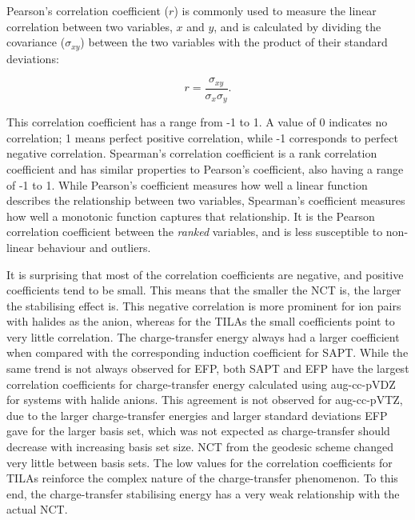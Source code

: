 Pearson's correlation coefficient ($r$) is commonly used to measure the linear correlation between two variables, $x$ and $y$, and is calculated by dividing the covariance ($\sigma_{xy}$) between the two variables with the product of their standard deviations:

\begin{equation}
    r = \frac{\sigma_{xy}}{\sigma_x \sigma_y}.
\end{equation}

This correlation coefficient has a range from -1 to 1.
A value of 0 indicates no correlation; 1 means perfect positive correlation, while -1 corresponds to perfect negative correlation.
Spearman's correlation coefficient is a rank correlation coefficient and has similar properties to Pearson's coefficient, also having a range of -1 to 1. 
While Pearson's coefficient measures how well a linear function describes the relationship between two variables, Spearman's coefficient measures how well a monotonic function captures that relationship.
It is the Pearson correlation coefficient between the \emph{ranked} variables, and is less susceptible to non-linear behaviour and outliers.


It is surprising that most of the correlation coefficients are negative, and positive coefficients tend to be small.
This means that the smaller the NCT is, the larger the stabilising effect is.
This negative correlation is more prominent for ion pairs with halides as the anion, whereas for the TILAs the small coefficients point to very little correlation.
The charge-transfer energy always had a larger coefficient when compared with the corresponding induction coefficient for SAPT.
While the same trend is not always observed for EFP, both SAPT and EFP have the largest correlation coefficients for charge-transfer energy calculated using aug-cc-pVDZ for systems with halide anions.
This agreement is not observed for aug-cc-pVTZ, due to the larger charge-transfer energies and larger standard deviations EFP gave for the larger basis set, which was not expected as charge-transfer should decrease with increasing basis set size. 
NCT from the geodesic scheme changed very little between basis sets.
The low values for the correlation coefficients for TILAs reinforce the complex nature of the charge-transfer phenomenon.
To this end, the charge-transfer stabilising energy has a very weak relationship with the actual NCT.

